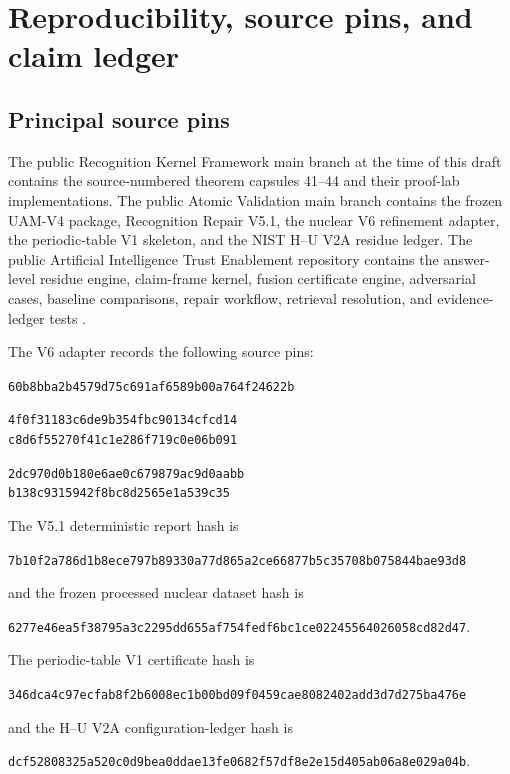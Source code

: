 \section{Reproducibility, source pins, and claim ledger}

\subsection{Principal source pins}

The public Recognition Kernel Framework main branch at the time of this draft contains the source-numbered theorem capsules 41--44 and their proof-lab implementations. The public Atomic Validation main branch contains the frozen UAM-V4 package, Recognition Repair V5.1, the nuclear V6 refinement adapter, the periodic-table V1 skeleton, and the NIST H--U V2A residue ledger. The public Artificial Intelligence Trust Enablement repository contains the answer-level residue engine, claim-frame kernel, fusion certificate engine, adversarial cases, baseline comparisons, repair workflow, retrieval resolution, and evidence-ledger tests \cite{aiTrustRelease}.

The V6 adapter records the following source pins:
\begin{description}[leftmargin=10em,style=multiline]
\item[RKF source commit] \nolinkurl{60b8bba2b4579d75c691af6589b00a764f24622b}
\item[Theorem 43 certificate] \texttt{4f0f31183c6de9b354fbc90134cfcd14}\\\texttt{c8d6f55270f41c1e286f719c0e06b091}
\item[Theorem 44 certificate] \texttt{2dc970d0b180e6ae0c679879ac9d0aabb}\\\texttt{b138c9315942f8bc8d2565e1a539c35}
\end{description}
The V5.1 deterministic report hash is
\begin{center}
\nolinkurl{7b10f2a786d1b8ece797b89330a77d865a2ce66877b5c35708b075844bae93d8}
\end{center}
and the frozen processed nuclear dataset hash is
\begin{center}
\nolinkurl{6277e46ea5f38795a3c2295dd655af754fedf6bc1ce02245564026058cd82d47}.
\end{center}
The periodic-table V1 certificate hash is
\begin{center}
\nolinkurl{346dca4c97ecfab8f2b6008ec1b00bd09f0459cae8082402add3d7d275ba476e}
\end{center}
and the H--U V2A configuration-ledger hash is
\begin{center}
\nolinkurl{dcf52808325a520c0d9bea0ddae13fe0682f57df8e2e15d405ab06a8e029a04b}.
\end{center}

